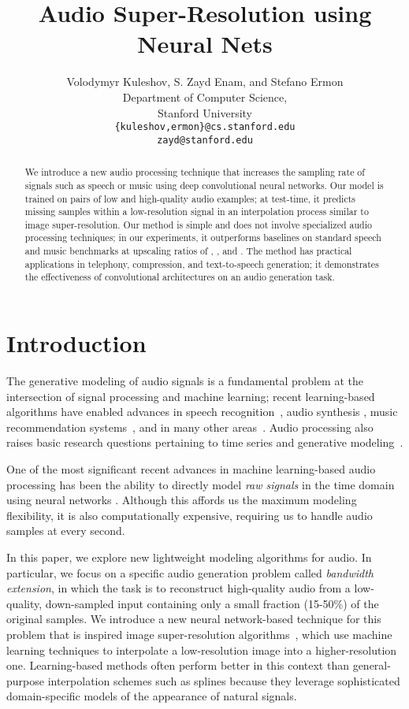 \documentclass{article} \usepackage{iclr2017_workshop,times}
\title{ Audio Super-Resolution using Neural Nets }
\author{Volodymyr Kuleshov, S. Zayd Enam, and Stefano Ermon \\
Department of Computer Science, \\
Stanford University\\
\texttt{\{kuleshov,ermon\}@cs.stanford.edu}\\
\texttt{zayd@stanford.edu}
}
\begin{document}
\maketitle

\begin{abstract}
We introduce a new audio processing technique that increases the sampling rate of  signals such as speech or music using deep convolutional neural networks.
Our model is trained on pairs of low and high-quality audio examples; at test-time, it predicts missing samples within a low-resolution signal in an interpolation process 
similar to image super-resolution.
Our method is simple and does not involve specialized audio processing techniques; in our experiments, it outperforms baselines 
on standard speech and music benchmarks at upscaling ratios of , , and . The method has practical applications in telephony, compression, and text-to-speech generation; it demonstrates the effectiveness of convolutional architectures on an audio generation task.

\end{abstract}

\section{Introduction}

The generative modeling of audio signals is a fundamental problem at the intersection of signal processing and machine learning; recent learning-based algorithms have enabled advances in speech recognition~\citep{hinton2012deep}, audio synthesis \citep{DBLP:journals/corr/OordDZSVGKSK16, mehri2016samplernn}, music recommendation systems~\citep{coviello2012multivariate, wang2014improving, liang2015content}, and in many other areas~\citep{acevedo2009automated}. Audio processing also raises basic research questions pertaining to time series and generative modeling~\citep{haykin2005cocktail,bilmes2004graphical}.

One of the most significant recent advances in machine learning-based audio processing has been the ability to directly model {\em raw signals} in the time domain using neural networks \citep{DBLP:journals/corr/OordDZSVGKSK16, mehri2016samplernn}. Although this affords us the maximum modeling flexibility, it is also computationally expensive, requiring us to handle  audio samples at every second. 

In this paper, we explore new lightweight modeling algorithms for audio.
In particular, we focus on a specific audio generation problem called {\em bandwidth extension}, in which the task is to reconstruct high-quality audio from a low-quality, down-sampled input containing only a small fraction (15-50\%) of the original samples. We introduce a new neural network-based technique for this problem that is inspired image super-resolution algorithms~\citep{Dong:2016:ISU:2914182.2914303}, which use machine learning techniques to interpolate a low-resolution image into a higher-resolution one. Learning-based methods often perform better in this context than general-purpose interpolation schemes such as splines because they leverage sophisticated domain-specific models of the appearance of natural signals.
 
\end{document}
